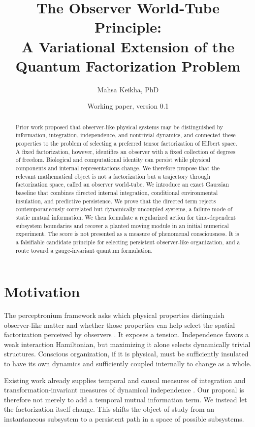 \documentclass[11pt]{article}
\title{The Observer World-Tube Principle:\\
A Variational Extension of the Quantum Factorization Problem}
\author{Mahsa Keikha, PhD}
\date{Working paper, version 0.1}
\begin{document}
\maketitle

\begin{abstract}
Prior work proposed that observer-like physical systems may be distinguished by
information, integration, independence, and nontrivial dynamics, and connected
these properties to the problem of selecting a preferred tensor factorization
of Hilbert space. A fixed factorization, however, identifies an observer with a
fixed collection of degrees of freedom. Biological and computational identity
can persist while physical components and internal representations change. We
therefore propose that the relevant mathematical object is not a factorization
but a trajectory through factorization space, called an observer world-tube.
We introduce an exact Gaussian baseline that combines directed internal
integration, conditional environmental insulation, and predictive persistence.
We prove that the directed term rejects contemporaneously correlated but
dynamically uncoupled systems, a failure mode of static mutual information. We
then formulate a regularized action for time-dependent subsystem boundaries and
recover a planted moving module in an initial numerical experiment. The score is
not presented as a measure of phenomenal consciousness. It is a falsifiable
candidate principle for selecting persistent observer-like organization, and a
route toward a gauge-invariant quantum formulation.
\end{abstract}

\section{Motivation}

The perceptronium framework asks which physical properties distinguish
observer-like matter and whether those properties can help select the spatial
factorization perceived by observers \citep{consciousness_state_matter_2015}. It exposes a
tension. Independence favors a weak interaction Hamiltonian, but maximizing it
alone selects dynamically trivial structures. Conscious organization, if it is
physical, must be sufficiently insulated to have its own dynamics and
sufficiently coupled internally to change as a whole.

Existing work already supplies temporal and causal measures of integration
\citep{oizumi2016,mediano2025} and transformation-invariant measures of
dynamical independence \citep{barnett2023}. Our proposal is therefore not merely
to add a temporal mutual information term. We instead let the factorization
itself change. This shifts the object of study from an instantaneous subsystem
to a persistent path in a space of possible subsystems.
\end{document}
